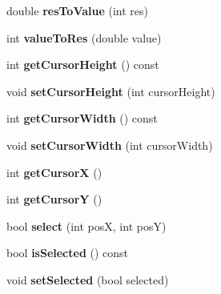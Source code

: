 \begin{DoxyCompactItemize}
\item 
\hypertarget{class_slider_ad866de0efb61986a82bdb50512acff3c}{}double {\bfseries res\+To\+Value} (int res)\label{class_slider_ad866de0efb61986a82bdb50512acff3c}

\item 
\hypertarget{class_slider_a1dde4ef475c2dff3b5f6542bf1964867}{}int {\bfseries value\+To\+Res} (double value)\label{class_slider_a1dde4ef475c2dff3b5f6542bf1964867}

\item 
\hypertarget{class_slider_ada143a519b663770b66de77fc3ef857e}{}int {\bfseries get\+Cursor\+Height} () const \label{class_slider_ada143a519b663770b66de77fc3ef857e}

\item 
\hypertarget{class_slider_a8f4543769959217510a5ac1e8bfaa635}{}void {\bfseries set\+Cursor\+Height} (int cursor\+Height)\label{class_slider_a8f4543769959217510a5ac1e8bfaa635}

\item 
\hypertarget{class_slider_aa163928f61bc81520c0c7fd93afbf5d2}{}int {\bfseries get\+Cursor\+Width} () const \label{class_slider_aa163928f61bc81520c0c7fd93afbf5d2}

\item 
\hypertarget{class_slider_ac05a2d600978b4624bcf5d0a03e1d038}{}void {\bfseries set\+Cursor\+Width} (int cursor\+Width)\label{class_slider_ac05a2d600978b4624bcf5d0a03e1d038}

\item 
\hypertarget{class_slider_aa10105d4f3e2a2437ed1e02a6e658406}{}int {\bfseries get\+Cursor\+X} ()\label{class_slider_aa10105d4f3e2a2437ed1e02a6e658406}

\item 
\hypertarget{class_slider_a06b36fa75a35eaef9e1ae4c1c94f4648}{}int {\bfseries get\+Cursor\+Y} ()\label{class_slider_a06b36fa75a35eaef9e1ae4c1c94f4648}

\item 
\hypertarget{class_slider_a0224c749072fc2123f4fd41e08fcc06e}{}bool {\bfseries select} (int pos\+X, int pos\+Y)\label{class_slider_a0224c749072fc2123f4fd41e08fcc06e}

\item 
\hypertarget{class_slider_a4ddcc0bd4e801071f7b32f6612d59a23}{}bool {\bfseries is\+Selected} () const \label{class_slider_a4ddcc0bd4e801071f7b32f6612d59a23}

\item 
\hypertarget{class_slider_a82aeb84ffd329dc6148827c2418a8e87}{}void {\bfseries set\+Selected} (bool selected)\label{class_slider_a82aeb84ffd329dc6148827c2418a8e87}

\end{DoxyCompactItemize}


